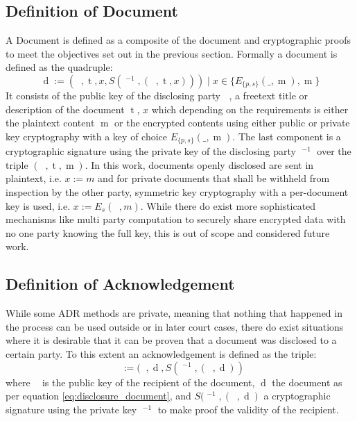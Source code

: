 \documentclass[12pt,msc,a4paper,oneside]{ucl_thesis}
\DeclareMathOperator{\party}{p}
\DeclareMathOperator{\doc}{d}
\DeclareMathOperator{\docack}{d^*}
\DeclareMathOperator{\owner}{o}
\DeclareMathOperator{\recipient}{r}
\DeclareMathOperator{\doctitle}{t}
\DeclareMathOperator{\content}{m}
\DeclareMathOperator{\keydocowner}{K_{{\party}_{\owner}}}
\DeclareMathOperator{\keydocrecipient}{K_{{\party}_{\recipient}}}
\DeclareMathOperator{\keydocument}{K_{\doc}}
\begin{document}
\subsection{Definition of Document} \label{sec:definition_of_document}
A Document is defined as a composite of the document and cryptographic proofs to meet the objectives set out in the previous section. Formally a document is defined as the quadruple:
\begin{equation}
    \doc := (\keydocowner, \doctitle, x, S(\keydocowner^{-1}, (\keydocowner, \doctitle, x))) \mid x \in \{ E_{\{p,s\}}(\_, \content), \content\}
    \label{eq:disclosure_document}
\end{equation}
It consists of the public key of the disclosing party $\keydocowner$, a freetext title or description of the document $\doctitle$, $x$ which depending on the requirements is either the plaintext content $\content$ or the encrypted contents using either public or private key cryptography with a key of choice $E_{\{p,s\}}(\_, \content)$. The last component is a cryptographic signature using the private key of the disclosing party $\keydocowner^{-1}$ over the triple $(\keydocowner, \doctitle, \content)$.
In this work, documents openly disclosed are sent in plaintext, i.e. $x := m$ and for private documents that shall be withheld from inspection by the other party, symmetric key cryptography with a per-document key is used, i.e. $x := E_s(\keydocument, m)$. While there do exist more sophisticated mechanisms like multi party computation to securely share encrypted data with no one party knowing the full key, this is out of scope and considered future work.

\subsection{Definition of Acknowledgement} \label{sec:definition_of_acknowledgement}
While some ADR methods are private, meaning that nothing that happened in the process can be used outside or in later court cases, there do exist situations where it is desirable that it can be proven that a document was disclosed to a certain party. To this extent an acknowledgement is defined as the triple:
\begin{equation}
    \docack := (\keydocrecipient, \doc, S(\keydocrecipient^{-1}, (\keydocrecipient, \doc))
    \label{eq:disclosure_ack}
\end{equation}
where $\keydocrecipient$ is the public key of the recipient of the document, $\doc$ the document as per equation \ref{eq:disclosure_document}, and $S(\keydocrecipient^{-1}, (\keydocrecipient, \doc)$ a cryptographic signature using the private key $\keydocrecipient^{-1}$ to make proof the validity of the recipient.
\end{document}
